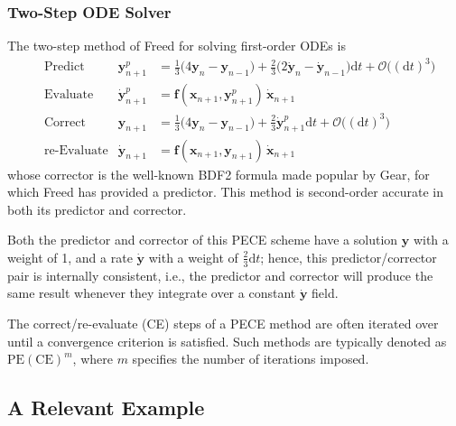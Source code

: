 \subsubsection{Two-Step ODE Solver}

The two-step method of Freed \cite{Freed17a} for solving first-order ODEs is
\begin{subequations}
    \label{1stOrderODEs}
    \begin{align}
    \mbox{} & \text{Predict} & 
    \mathbf{y}_{n+1}^p & = \tfrac{1}{3} 
    \bigl( 4 \mathbf{y}_n - \mathbf{y}_{n-1} \bigr) + 
    \tfrac{2}{3} \bigl( 2 \dot{\mathbf{y}}_n - \dot{\mathbf{y}}_{n-1} 
    \bigr) \mathrm{d}t + \mathcal{O} \bigl( (\mathrm{d}t)^3 \bigr)
    \label{1stOrderPredictor} \\
    \mbox{} & \text{Evaluate} & 
    \dot{\mathbf{y}}^p_{n+1} & = \mathbf{f} (\mathbf{x}_{n+1} , \mathbf{y}_{n+1}^p) \, \dot{\mathbf{x}}_{n+1}
    \label{1stOrderEvaluate} \\
    \mbox{} & \text{Correct} &
    \mathbf{y}_{n+1} & = \tfrac{1}{3} 
    \bigl( 4 \mathbf{y}_n - \mathbf{y}_{n-1} \bigr) + 
    \tfrac{2}{3} \dot{\mathbf{y}}^{p}_{n+1} \mathrm{d}t + 
    \mathcal{O} \bigl( (\mathrm{d}t)^3 \bigr)
    \label{1stOrderCorrector} \\
    \mbox{} & \text{re-Evaluate} & 
    \dot{\mathbf{y}}_{n+1} & = \mathbf{f} (\mathbf{x}_{n+1} , \mathbf{y}_{n+1}) \, 
    \dot{\mathbf{x}}_{n+1}
    \label{1stOrderReEvaluate}
    \end{align}
\end{subequations} 
whose corrector is the well-known BDF2 formula made popular by Gear, for which Freed has provided a predictor.  This method is second-order accurate in both its predictor and corrector.

Both the predictor and corrector of this PECE scheme have a solution $\mathbf{y}$ with a weight of 1, and a rate $\dot{\mathbf{y}}$ with a weight of $\tfrac{2}{3} \mathrm{d}t$; hence, this predictor\slash corrector pair is internally consistent, i.e., the predictor and corrector will produce the same result whenever they integrate over a constant $\dot{\mathbf{y}}$ field. 

The correct\slash re-evaluate (CE) steps of a PECE method are often iterated over until a convergence criterion is satisfied.  Such methods are typically denoted as $\text{PE}(\text{CE})^m$, where $m$ specifies the number of iterations imposed.


\subsection{A Relevant Example}

